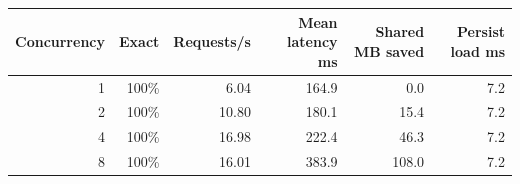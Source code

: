 \begin{tabular}{rrrrrr}
\toprule
Concurrency & Exact & Requests/s & Mean latency ms & Shared MB saved & Persist load ms \\
\midrule
1 & 100\% & 6.04 & 164.9 & 0.0 & 7.2 \\
2 & 100\% & 10.80 & 180.1 & 15.4 & 7.2 \\
4 & 100\% & 16.98 & 222.4 & 46.3 & 7.2 \\
8 & 100\% & 16.01 & 383.9 & 108.0 & 7.2 \\
\bottomrule
\end{tabular}

